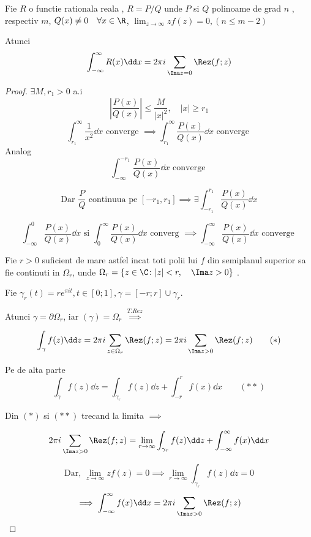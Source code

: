 \begin{tip}
    Fie $R$ o functie rationala reala , $R=P / Q$ unde $P$ si $Q$ polinoame de
    grad $n$ , respectiv $m$, $Q(x)\neq 0 \quad \forall x\in \R$,
    $\displaystyle \lim_{z\to\infty} z f(z) =0, (n \leq m-2)$

        Atunci
    \[
        \int_{-\infty}^{\infty} R(x) \dd x = 2\pi i \sum_{\Ima z = 0} \Rez(f;z)
    \]
    \begin{proof}
        $\exists M,r_1 >0 $ a.i
        \[
            \left|\frac{P(x)}{Q(x)} \right| \leq \frac{M}{|x|^2} , \quad |x| \geq r_1
        \]
        \[
            \int_{r_1}^{\infty} \frac{1}{x^2} \dd x \text{ converge } \implies
            \int_{r_1}^{\infty} \frac{P(x)}{Q(x)} \dd x \text{ converge }
        \]
        Analog
        \[
           \int_{ - \infty}^{- r_1} \frac{P(x)}{Q(x)} \dd x \text{ converge }
        \]

                \[
                    \text{Dar } \frac{P}{Q} \text{ continuua pe } [- r_1, r_1] \implies
            \exists \int_{- r_1}^{r_1} \frac{P(x)}{Q(x)} \dd x
                \]

        \[
            \int_{- \infty}^{0} \frac{P(x)}{Q(x)} \dd x \text{ si }
            \int_{0}^{\infty} \frac{P(x)}{Q(x)} \dd x \text{ converg } \implies
            \int_{- \infty}^{\infty} \frac{P(x)}{Q(x)} \dd x \text{ converge }
        \]

        Fie $r>0$ suficient de mare astfel incat toti polii lui $f$ din semiplanul
        superior sa fie continuti in $\Omega_r$, unde $\Omega_r = \{z\in\C \colon |z| < r,\quad \Ima z > 0\}$ .

                Fie $\gamma_r(t) = r e^{\pi i t}, t\in[0;1], \gamma=[-r;r]\cup \gamma_r$.

                Atunci $\gamma = \partial \Omega_r$, iar $(\gamma) = \Omega_r$
        $\overset{T. Rez}{\implies}$

        \begin{equation*}
            \int_{\gamma} f(z) \dd z = 2 \pi i \sum_{z \in \Omega_r} \Rez(f;z)
                = 2 \pi i \sum_{\Ima z >0} \Rez(f;z)  \qquad (*)
        \end{equation*}

        Pe de alta parte
        \begin{equation*}
            \int_{\gamma} f(z) \dd z = \int_{\gamma_r} f(z) \dd z + \int_{-r}^{r} f(x) \dd x \qquad (**)
        \end{equation*}

        Din $(*)$ si $(**)$ trecand la limita $\implies$

        \[
            2 \pi i \sum_{\Ima z >0} \Rez(f;z) = \lim_{r\to \infty} \int_{\gamma_r} f(z) \dd z
                + \int_{- \infty}^{\infty} f(x) \dd x
        \]

        \[
            \text{Dar, } \lim_{z\to\infty} z f(z)=0 \implies \lim_{r\to\infty} \int_{\gamma_r} f(z) \dd z = 0
        \]
        \[
            \implies \int_{- \infty}^{\infty} f(x) \dd x = 2 \pi i \sum_{\Ima z >0} \Rez(f;z)
        \]
    \end{proof}
\end{tip}


